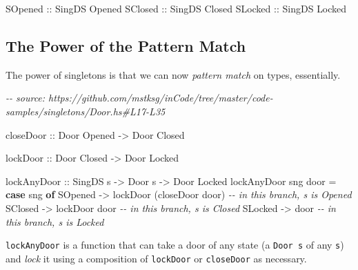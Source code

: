\documentclass[]{article}
\newenvironment{Shaded}{}{}
\newcommand{\CommentTok}[1]{\textcolor[rgb]{0.38,0.63,0.69}{\textit{#1}}}
\newcommand{\DataTypeTok}[1]{\textcolor[rgb]{0.56,0.13,0.00}{#1}}
\newcommand{\KeywordTok}[1]{\textcolor[rgb]{0.00,0.44,0.13}{\textbf{#1}}}
\newcommand{\NormalTok}[1]{#1}
\newcommand{\OtherTok}[1]{\textcolor[rgb]{0.00,0.44,0.13}{#1}}
\begin{document}
\begin{Shaded}
\begin{Highlighting}[]
\DataTypeTok{SOpened}\OtherTok{ ::} \DataTypeTok{SingDS} \DataTypeTok{\textquotesingle{}Opened}
\DataTypeTok{SClosed}\OtherTok{ ::} \DataTypeTok{SingDS} \DataTypeTok{\textquotesingle{}Closed}
\DataTypeTok{SLocked}\OtherTok{ ::} \DataTypeTok{SingDS} \DataTypeTok{\textquotesingle{}Locked}
\end{Highlighting}
\end{Shaded}

\hypertarget{the-power-of-the-pattern-match}{%
\subsection{The Power of the Pattern
Match}\label{the-power-of-the-pattern-match}}

The power of singletons is that we can now \emph{pattern match} on types,
essentially.

\begin{Shaded}
\begin{Highlighting}[]
\CommentTok{{-}{-} source: https://github.com/mstksg/inCode/tree/master/code{-}samples/singletons/Door.hs\#L17{-}L35}

\OtherTok{closeDoor ::} \DataTypeTok{Door} \DataTypeTok{\textquotesingle{}Opened} \OtherTok{{-}>} \DataTypeTok{Door} \DataTypeTok{\textquotesingle{}Closed}

\OtherTok{lockDoor ::} \DataTypeTok{Door} \DataTypeTok{\textquotesingle{}Closed} \OtherTok{{-}>} \DataTypeTok{Door} \DataTypeTok{\textquotesingle{}Locked}

\OtherTok{lockAnyDoor ::} \DataTypeTok{SingDS}\NormalTok{ s }\OtherTok{{-}>} \DataTypeTok{Door}\NormalTok{ s }\OtherTok{{-}>} \DataTypeTok{Door} \DataTypeTok{\textquotesingle{}Locked}
\NormalTok{lockAnyDoor sng door }\OtherTok{=} \KeywordTok{case}\NormalTok{ sng }\KeywordTok{of}
    \DataTypeTok{SOpened} \OtherTok{{-}>}\NormalTok{ lockDoor (closeDoor door) }\CommentTok{{-}{-} in this branch, s is \textquotesingle{}Opened}
    \DataTypeTok{SClosed} \OtherTok{{-}>}\NormalTok{ lockDoor door             }\CommentTok{{-}{-} in this branch, s is \textquotesingle{}Closed}
    \DataTypeTok{SLocked} \OtherTok{{-}>}\NormalTok{ door                      }\CommentTok{{-}{-} in this branch, s is \textquotesingle{}Locked}
\end{Highlighting}
\end{Shaded}

\texttt{lockAnyDoor} is a function that can take a door of any state (a
\texttt{Door\ s} of any \texttt{s}) and \emph{lock} it using a composition of
\texttt{lockDoor} or \texttt{closeDoor} as necessary.
\end{document}
